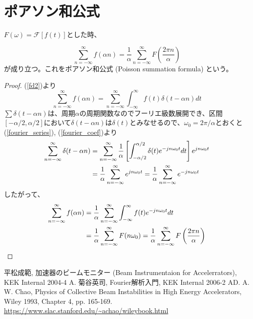 \documentclass[]{jlreq}
\theoremstyle{definition}
\begin{document}
\appendix
\renewcommand{\theequation}{\Alph{section}.\arabic{equation} }
\setcounter{equation}{0}

\section{ポアソン和公式}

$F(\omega) = \mathcal{F}[f(t)]$とした時、

\begin{equation}
  \sum_{n=-\infty}^{\infty} f(\alpha n) = \frac{1}{\alpha} \sum_{n=-\infty}^{\infty} F\left( \frac{2 \pi n}{\alpha}\right)
\end{equation}
%
が成り立つ。これをポアソン和公式 (Poisson summation formula) という。
%
\begin{proof}
  (\ref{fd2})より
  \begin{equation}
    \sum_{n=-\infty}^{\infty} f(\alpha n) = \sum_{n=-\infty}^{\infty}\int_{-\infty}^{\infty} f(t) \delta(t - \alpha n) dt
  \end{equation}
  $\sum \delta(t - \alpha n)$は、周期$\alpha$の周期関数なのでフーリエ級数展開でき、区間$[-\alpha/2, \alpha/2]$において$\delta(t-\alpha n)$は$\delta(t)$とみなせるので、$\omega_0 = 2\pi/\alpha$とおくと(\ref{fourier_series}), (\ref{fourier_coef})より
  \begin{align}
    \sum_{n=-\infty}^{\infty}\delta(t - \alpha n) 
    &= \sum_{n=-\infty}^{\infty} \frac{1}{\alpha} \left[ \int_{-\alpha/2}^{\alpha/2} \delta(t) e^{-j n\omega_0 t} dt \right] e^{j n \omega_0 t} \notag\\
    &= \frac{1}{\alpha} \sum_{n=-\infty}^{\infty} e^{j n\omega_0 t} = \frac{1}{\alpha} \sum_{n=-\infty}^{\infty} e^{-j n\omega_0 t} 
  \end{align}
  したがって、
  \begin{align}
    \sum_{n=-\infty}^{\infty} f(\alpha n) &=\frac{1}{\alpha} \sum_{n=-\infty}^{\infty} \int_{-\infty}^{\infty} f(t) e^{-j n \omega_0 t} dt \notag\\
      &= \frac{1}{\alpha} \sum_{n=-\infty}^{\infty}F(n\omega_0) 
      = \frac{1}{\alpha} \sum_{n=-\infty}^{\infty} F\left( \frac{2 \pi n}{\alpha}\right) \notag
  \end{align}
\end{proof}
%
\begin{thebibliography}{9}
  平松成範, 加速器のビームモニター (Beam Instrumentaion for Accelerrators), KEK Internal 2004-4 A.
  菊谷英司, Fourier解析入門, KEK Internal 2006-2 AD.
  A. W. Chao, Physics of Collective Beam Instabilities in High Energy Accelerators, Wiley 1993, Chapter 4, pp. 165-169.
  \url{https://www.slac.stanford.edu/~achao/wileybook.html}
\end{thebibliography}
%
\end{document}
